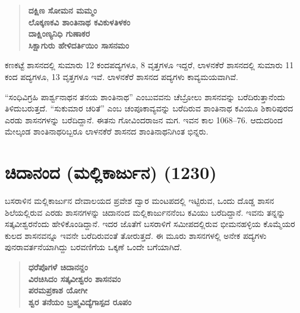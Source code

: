 \begin{verse}
\textbf{ದಕ್ಷಿಣ ಸೋಮನ ಮಮ್ಮಂ} \\\textbf{ಲೊಕ್ಕಣಕವಿ ಶಾಂತಿನಾಥ ಕವಿಕುಳತಿಳಕಂ} \\\textbf{ದಾಕ್ಷಿಂಣ್ಯನಿಧಿ ಗುಣಾಕರ} \\\textbf{ಸಿಕ್ಷಾಗುರು ಹೇಳಿದರ್ತಿಯಿಂ ಸಾಸನಮಂ}
\end{verse}

ಕಣಕಟ್ಟೆ ಶಾಸನದಲ್ಲಿ ಸುಮಾರು 12 ಕಂದಪದ್ಯಗಳೂ, 8 ವೃತ್ತಗಳೂ ಇದ್ದರೆ, ಲಾಳನಕೆರೆ ಶಾಸನದಲ್ಲಿ ಸುಮಾರು 11 ಕಂದ ಪದ್ಯಗಳೂ, 13 ವೃತ್ತಗಳೂ ಇವೆ. ಲಾಳನಕೆರೆ ಶಾಸನದ ಪದ್ಯಗಳು ಕಾವ್ಯಮಯವಾಗಿವೆ.

“ಸಂಧಿವಿಗ್ರಹಿ ಪಾರ್ಶ್ವನಾಥನ ತನಯ ಶಾಂತಿನಾಥ” ಎಂಬುವವನು ಚೆಬ್ರೋಲು ಶಾಸನವನ್ನು ಬರೆದಿರುತ್ತಾನೆಂದು ತಿಳಿದುಬರುತ್ತದೆ. “ಸುಕುಮಾರ ಚರಿತೆ” ಎಂಬ ಚಂಪೂಕಾವ್ಯವನ್ನು ಬರೆದಿರುವ ಶಾಂತಿನಾಥ ಕವಿಯೂ ಶಿಕಾರಿಪುರದ ಎರಡು ಶಾಸನಗಳನ್ನು ಬರೆದಿದ್ದಾನೆ. ಈತನು ಗೋವಿಂದರಾಜನ ಮಗ. ಇವನ ಕಾಲ 1068–76. ಆದುದರಿಂದ ಮೇಲ್ಕಂಡ ಶಾಂತಿನಾಥರಿಬ್ಬರೂ ಲಾಳನಕೆರೆ ಶಾಸನದ ಶಾಂತಿನಾಥನಿಗಿಂತ ಭಿನ್ನರು.


\section{ಚಿದಾನಂದ (ಮಲ್ಲಿಕಾರ್ಜುನ) (1230)}

ಬಸರಾಳಿನ ಮಲ್ಲಿಕಾರ್ಜುನ ದೇವಾಲಯದ ಪ್ರವೇಶ ದ್ವಾರ ಮಂಟಪದಲ್ಲಿ ಇಟ್ಟಿರುವ, ಒಂದು ದೊಡ್ಡ ಶಾಸನ ಶಿಲೆಯಲ್ಲಿರುವ ಎರಡು ಶಾಸನಗಳನ್ನು ಚಿದಾನಂದ ಮಲ್ಲಿಕಾರ್ಜುನನೆಂಬ ಕವಿಯು ಬರೆದಿದ್ದಾನೆ. ಇವನು ತನ್ನನ್ನು ಸತ್ಕವೀಶ್ವರನೆಂದು ಹೇಳಿಕೊಂಡಿದ್ದಾನೆ. ಇದರ ಜೊತೆಗೆ ಬಸರಾಳಿಗೆ ಸಮೀಪದಲ್ಲಿರುವ ಭೀಮನಹಳ್ಳಿಯ ಕೊಮ್ಮೆಯರ ಕುಲದ ಶಾಸನವನ್ನೂ ಇವನೇ ಬರೆದಿರುವಂತೆ ತೋರುತ್ತದೆ. ಈ ಮೂರು ಶಾಸನಗಳಲ್ಲಿ ಅನೇಕ ಪದ್ಯಗಳು ಪುನರಾವರ್ತನೆಯಾಗಿದ್ದು ಬರವಣಿಗೆಯ ಒಕ್ಕಣೆ ಒಂದೇ ಬಗೆಯಾಗಿದೆ.

\begin{verse}
\textbf{ಧರೆಪೊಗಳೆ ಚಿದಾನನ್ದಂ} \\\textbf{ವಿರಚಿಸಿದಂ ಸತ್ಕವೀಶ್ವರಂ ಶಾಸನವಂ} \\\textbf{ಪರಮಪ್ರಕಾಶ ಯೋಗೀ} \\\textbf{ಶ್ವರ ತನೆಯಂ ಬ್ರಹ್ಮವಿದ್ಯೆಗಾಸ್ಪದ ರೂಪಂ}
\end{verse}

